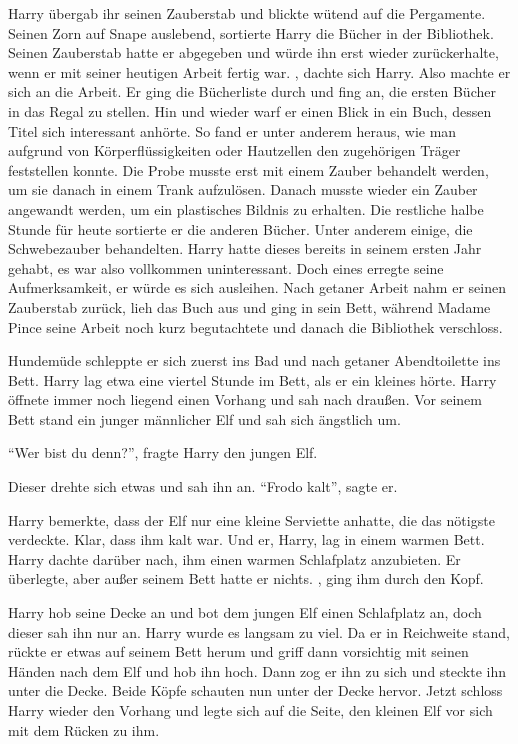Harry übergab ihr seinen Zauberstab und blickte wütend auf die Pergamente. Seinen Zorn auf Snape auslebend, sortierte Harry die Bücher in der Bibliothek. Seinen Zauberstab hatte er abgegeben und würde ihn erst wieder zurückerhalte, wenn er mit seiner heutigen Arbeit fertig war. , dachte sich Harry. Also machte er sich an die Arbeit. Er ging die Bücherliste durch und fing an, die ersten Bücher in das Regal zu stellen. Hin und wieder warf er einen Blick in ein Buch, dessen Titel sich interessant anhörte. So fand er unter anderem heraus, wie man aufgrund von Körperflüssigkeiten oder Hautzellen den zugehörigen Träger feststellen konnte. Die Probe musste erst mit einem Zauber behandelt werden, um sie danach in einem Trank aufzulösen. Danach musste wieder ein Zauber angewandt werden, um ein plastisches Bildnis zu erhalten. Die restliche halbe Stunde für heute sortierte er die anderen Bücher. Unter anderem einige, die Schwebezauber behandelten. Harry hatte dieses bereits in seinem ersten Jahr gehabt, es war also vollkommen uninteressant. Doch eines erregte seine Aufmerksamkeit, er würde es sich ausleihen. Nach getaner Arbeit nahm er seinen Zauberstab zurück, lieh das Buch aus und ging in sein Bett, während Madame Pince seine Arbeit noch kurz begutachtete und danach die Bibliothek verschloss.

Hundemüde schleppte er sich zuerst ins Bad und nach getaner Abendtoilette ins Bett. Harry lag etwa eine viertel Stunde im Bett, als er ein kleines  hörte. Harry öffnete \gst immer noch liegend \gst einen Vorhang und sah nach draußen. Vor seinem Bett stand ein junger männlicher Elf und sah sich ängstlich um.

\enquote{Wer bist du denn?}, fragte Harry den jungen Elf.

Dieser drehte sich etwas und sah ihn an. \enquote{Frodo kalt}, sagte er.

Harry bemerkte, dass der Elf nur eine kleine Serviette anhatte, die das nötigste verdeckte. Klar, dass ihm kalt war. Und er, Harry, lag in einem warmen Bett. Harry dachte darüber nach, ihm einen warmen Schlafplatz anzubieten. Er überlegte, aber außer seinem Bett hatte er nichts. , ging ihm durch den Kopf.

Harry hob seine Decke an und bot dem jungen Elf einen Schlafplatz an, doch dieser sah ihn nur an. Harry wurde es langsam zu viel. Da er in Reichweite stand, rückte er etwas auf seinem Bett herum und griff dann vorsichtig mit seinen Händen nach dem Elf und hob ihn hoch. Dann zog er ihn zu sich und steckte ihn unter die Decke. Beide Köpfe schauten nun unter der Decke hervor. Jetzt schloss Harry wieder den Vorhang und legte sich auf die Seite, den kleinen Elf vor sich mit dem Rücken zu ihm.

